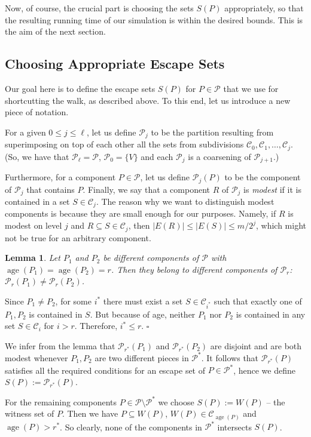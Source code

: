 \documentclass[11pt, letterpaper]{article}
\newtheorem{lemma}[theorem]{Lemma}
\newenvironment{proof}{\noindent{\bf Proof:}\hspace*{1em}}{\qed\bigskip}
\newcommand{\qed}{\hfill\ensuremath{\square}}
\DeclareMathOperator{\age}{age}
\newcommand{\cC}{\mathcal{C}}
\newcommand{\cP}{\mathcal{P}}
\begin{document}
Now, of course, the crucial part is choosing the sets $S(P)$ appropriately, so that the resulting running time of our simulation is within the desired bounds. This is the aim of the next section. 

\subsection{Choosing Appropriate Escape Sets}
Our goal here is to define the escape sets $S(P)$ for $P\in \cP$ that we use for shortcutting the walk, as described above. To this end, let us introduce a new piece of notation.

For a given $0\leq j\leq \ell$, let us define $\cP_j$ to be the partition resulting from superimposing on top of each other all the sets from subdivisions $\cC_0, \cC_1, \dots, \cC_j$. (So, we have that $\cP_{\ell} = \cP$, $\cP_0 = \{V\}$ and each $\cP_{j}$ is a coarsening of $\cP_{j+1}$.)

 Furthermore, for a component $P \in \cP$, let us define $\cP_j(P)$ to be the component of $\cP_j$ that contains $P$. Finally, we say that a component $R$ of $\cP_j$ is \emph{modest} if it is contained in a set $S \in \cC_j$. The reason why we want to distinguish modest components is because they are small enough for our purposes. Namely, if $R$ is modest on level $j$ and $R\subseteq S\in \cC_j$, then $|E(R)|\leq |E(S)|\leq m/2^{j}$, which might not be true for an arbitrary component.

\begin{lemma}
\label{lem:different_Pp_components}
Let $P_1$ and $P_2$ be different components of $\cP$ with $\age(P_1) = \age(P_2) = r$. Then they belong to different components of $\cP_r$: $\cP_r(P_1) \neq \cP_r(P_2)$.
\end{lemma}
\begin{proof}
Since $P_1 \neq P_2$, for some $i^*$ there must exist a set $S \in \cC_{i^*}$ such that exactly one of $P_1,P_2$ is contained in $S$. But because of age, neither $P_1$ nor $P_2$ is contained in any set $S \in \cC_i$ for $i > r$. Therefore, $i^* \le r$.
\end{proof}

We infer from the lemma that $\cP_{r^*}(P_1)$ and $\cP_{r^*}(P_2)$ are disjoint and are both modest whenever $P_1,P_2$ are two different pieces in $\cP^*$. It follows that $\cP_{r^*}(P)$ satisfies all the required conditions for an escape set of $P\in \cP^*$, hence we define $S(P):=\cP_{r^*}(P)$. 

For the remaining components $P\in \cP\setminus \cP^*$ we choose $S(P):=W(P)$ -- the witness set of $P$. Then we have $P\subseteq W(P)$, $W(P)\in \cC_{\age(P)}$ and $\age(P)>r^*$. So clearly, none of the components in $\cP^*$ intersects $S(P)$.
\end{document}
